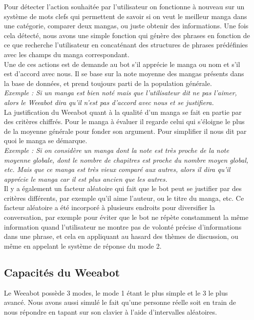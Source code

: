 \documentclass[paper=a4, fontsize=11pt]{article}
\begin{document}
Pour détecter l’action souhaitée par l’utilisateur on fonctionne à nouveau sur un système de mots clefs qui permettent de savoir si on veut le meilleur manga dans une catégorie, comparer deux mangas, ou juste obtenir des informations. Une fois cela détecté, nous avons une simple fonction qui génère des phrases en fonction de ce que recherche l’utilisateur en concaténant des structures de phrases prédéfinies avec les champs du manga correspondant. \\
Une de ces actions est de demande au bot s’il apprécie le manga ou nom et s’il est d’accord avec nous. Il se base sur la note moyenne des mangas présents dans la base de données, et prend toujours parti de la population générale.\\
\textit{Exemple : Si un manga est bien noté mais que l’utilisateur dit ne pas l’aimer, alors le Weeabot dira qu’il n’est pas d’accord avec nous et se justifiera.} \\
La justification du Weeabot quant à la qualité d’un manga se fait en partie par des critères chiffrés. Pour le manga à évaluer il regarde celui qui s’éloigne le plus de la moyenne générale pour fonder son argument. Pour simplifier il nous dit par quoi le manga se démarque. \\

\textit{Exemple : Si on considère un manga dont la note est très proche de la note moyenne globale, dont le nombre de chapitres est proche du nombre moyen global, etc. Mais que ce manga est très vieux comparé aux autres, alors il dira qu’il apprécie le manga car il est plus ancien que les autres.} \\
Il y a également un facteur aléatoire qui fait que le bot peut se justifier par des critères différents, par exemple qu’il aime l’auteur, ou le titre du manga, etc.
Ce facteur aléatoire a été incorporé à plusieurs endroits pour diversifier la conversation, par exemple pour éviter que le bot ne répète constamment la même information quand l’utilisateur ne montre pas de volonté précise d’informations dans une phrase, et cela en appliquant au hasard des thèmes de discussion, ou même en appelant le système de réponse du mode 2. \\


\subsection{Capacités du Weeabot}
Le Weeabot possède 3 modes, le mode 1 étant le plus simple et le 3 le plus avancé. Nous avons aussi simulé le fait qu'une personne réelle soit en train de nous répondre en tapant sur son clavier à l'aide d'intervalles aléatoires.\\
\end{document}
